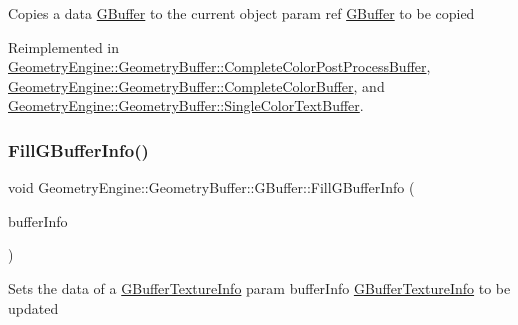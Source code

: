 Copies a data \mbox{\hyperlink{class_geometry_engine_1_1_geometry_buffer_1_1_g_buffer}{G\+Buffer}} to the current object param ref \mbox{\hyperlink{class_geometry_engine_1_1_geometry_buffer_1_1_g_buffer}{G\+Buffer}} to be copied 

Reimplemented in \mbox{\hyperlink{class_geometry_engine_1_1_geometry_buffer_1_1_complete_color_post_process_buffer_ac7d1a90658b1a2f59674b76685e8b052}{Geometry\+Engine\+::\+Geometry\+Buffer\+::\+Complete\+Color\+Post\+Process\+Buffer}}, \mbox{\hyperlink{class_geometry_engine_1_1_geometry_buffer_1_1_complete_color_buffer_a0630be352a9267083d42802fb22ae36b}{Geometry\+Engine\+::\+Geometry\+Buffer\+::\+Complete\+Color\+Buffer}}, and \mbox{\hyperlink{class_geometry_engine_1_1_geometry_buffer_1_1_single_color_text_buffer_a6e266272638dd67cec7b6d57f172eae2}{Geometry\+Engine\+::\+Geometry\+Buffer\+::\+Single\+Color\+Text\+Buffer}}.

\mbox{\label{class_geometry_engine_1_1_geometry_buffer_1_1_g_buffer_ad1242e69d277b69b58497f7d489e176c}} 
\subsubsection{\texorpdfstring{FillGBufferInfo()}{FillGBufferInfo()}}
{\footnotesize\ttfamily void Geometry\+Engine\+::\+Geometry\+Buffer\+::\+G\+Buffer\+::\+Fill\+G\+Buffer\+Info (\begin{DoxyParamCaption}\item[{\mbox{\hyperlink{struct_geometry_engine_1_1_g_buffer_texture_info}{G\+Buffer\+Texture\+Info}} \&}]{buffer\+Info }\end{DoxyParamCaption})}

Sets the data of a \mbox{\hyperlink{struct_geometry_engine_1_1_g_buffer_texture_info}{G\+Buffer\+Texture\+Info}} param buffer\+Info \mbox{\hyperlink{struct_geometry_engine_1_1_g_buffer_texture_info}{G\+Buffer\+Texture\+Info}} to be updated \mbox{\label{class_geometry_engine_1_1_geometry_buffer_1_1_g_buffer_aac01b2527d2b501e1f923ae6558469e5}} 
